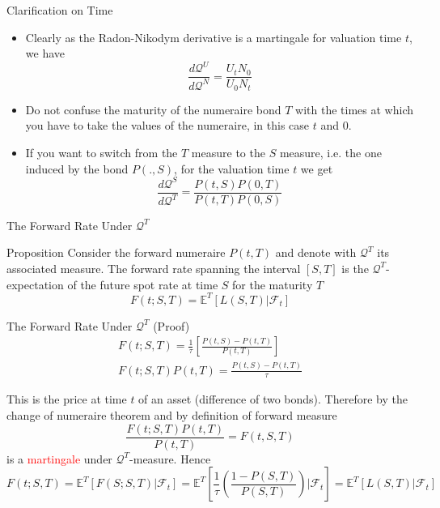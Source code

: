 \documentclass{beamer}
\begin{document}
\begin{frame}{Clarification on Time}
  \begin{itemize}
  \item Clearly as the Radon-Nikodym derivative is a martingale for valuation time $t$, we have
    \begin{equation*}
      \frac{d\mathcal{Q}^U}{d\mathcal{Q}^N}=\frac{U_tN_0}{U_0N_t}
    \end{equation*}
  \item Do not confuse the maturity of the numeraire bond $T$ with the times at which you have to take the values of the numeraire, in this case $t$ and 0.
  \item If you want to switch from the $T$ measure to the $S$ measure, i.e. the one induced by the bond $P(.,S)$, for the valuation time $t$ we get
    \begin{equation*}
      \frac{d\mathcal{Q}^S}{d\mathcal{Q}^T}=\frac{P(t,S)P(0,T)}{P(t,T)P(0,S)}
    \end{equation*}
  \end{itemize}
\end{frame}

\begin{frame}{The Forward Rate Under $\mathcal{Q}^T$}
  \begin{block}{Proposition}
    Consider the forward numeraire $P(t,T)$ and denote with $\mathcal{Q}^T$ its associated measure.
    The forward rate spanning the interval $[S,T]$ is the $\mathcal{Q}^T$-expectation of the future spot rate at time $S$ for the maturity $T$
    \begin{equation}
      F(t;S,T) =\mathbb{E}^T[L(S,T)|\mathcal{F}_t]
    \end{equation}
  \end{block}
\end{frame}

\begin{frame}{The Forward Rate Under $\mathcal{Q}^T$ (Proof)}
  \begin{equation*}
    \begin{gathered}
      F(t;S,T) = \frac{1}{\tau}\left[\frac{P(t,S)-P(t,T)}{P(t,T)}\right] \\[0.3cm]
      F(t;S,T)P(t,T) = \frac{P(t,S)-P(t,T)}{\tau}
    \end{gathered}
  \end{equation*}

  This is the price at time $t$ of an asset (difference of two bonds). Therefore by the change of numeraire theorem and by definition of forward measure
  \begin{equation*}
    \frac{F(t;S,T)P(t,T)}{P(t,T)} = F(t,S,T)
  \end{equation*}
  is a \textcolor{red}{martingale} under $\mathcal{Q}^T$-measure. \pause Hence
  \begin{equation*}
    F(t;S,T) = \mathbb{E}^T[F(S;S,T)|\mathcal{F}_t] = \mathbb{E}^T\left[\frac{1}{\tau}\left(\frac{1-P(S,T)}{P(S,T)}\right)\bigg|\mathcal{F}_t\right] = \mathbb{E}^T[L(S,T)|\mathcal{F}_t]
  \end{equation*}
\end{frame}
\end{document}

